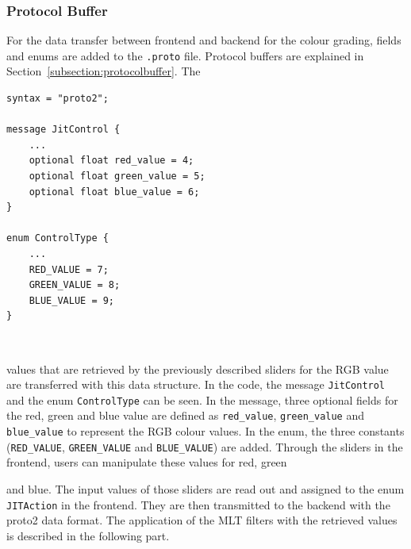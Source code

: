 \documentclass[../MasterThesis.tex]{subfiles}
\begin{document}
\subsubsection*{Protocol Buffer}

For the data transfer between frontend and backend for the colour grading, fields and enums are added to the \texttt{.proto} file. Protocol buffers are explained in Section~\ref{subsection:protocolbuffer}. The 
%
\begin{minipage}{0.54\textwidth}
\vspace*{-0.2em}
\begin{lstlisting}[style=protobufStyle, numbers=none]
syntax = "proto2";
	
message JitControl {
	...
	optional float red_value = 4; 
	optional float green_value = 5; 
	optional float blue_value = 6; 
}
	
enum ControlType {
	...
	RED_VALUE = 7;
	GREEN_VALUE = 8;
	BLUE_VALUE = 9;
}
\end{lstlisting}
\hfill
\end{minipage}\begin{minipage}{0.04\textwidth}
	\ 
\end{minipage}\begin{minipage}{0.42\textwidth}
\vspace*{0.6em}
values that are retrieved by the previously described sliders for the RGB value are transferred with this data structure.
In the code, the message \texttt{JitControl} and the enum \texttt{ControlType} can be seen. 
In the message, three optional fields for the red, green and blue value are defined as \texttt{red\_value}, \texttt{green\_value} and \texttt{blue\_value} to represent the RGB colour values. 
In the enum, the three constants (\texttt{RED\_VALUE}, \texttt{GREEN\_VALUE} and \texttt{BLUE\_VALUE}) are added. 
Through the sliders in the frontend, users can manipulate these values for red, green

\end{minipage}

and blue. The input values of those sliders are read out and assigned to the enum \texttt{JITAction} in the frontend. They are then transmitted to the backend with the proto2 data format. The application of the MLT filters with the retrieved values is described in the following part.
\end{document}
